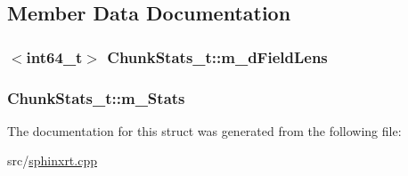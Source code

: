 \subsection{Member Data Documentation}
\hypertarget{structChunkStats__t_a4b6fbf0db8544a35c5a19359d704fa29}{
\subsubsection[{m\-\_\-d\-Field\-Lens}]{$<${\bf int64\-\_\-t}$>$ Chunk\-Stats\-\_\-t\-::m\-\_\-d\-Field\-Lens}}\label{structChunkStats__t_a4b6fbf0db8544a35c5a19359d704fa29}
\hypertarget{structChunkStats__t_aac0f3b2c7a4b92884e34a1d27377f165}{
\subsubsection[{m\-\_\-\-Stats}]{ Chunk\-Stats\-\_\-t\-::m\-\_\-\-Stats}}\label{structChunkStats__t_aac0f3b2c7a4b92884e34a1d27377f165}


The documentation for this struct was generated from the following file\-:\begin{DoxyCompactItemize}
\item 
src/\hyperlink{sphinxrt_8cpp}{sphinxrt.\-cpp}\end{DoxyCompactItemize}
